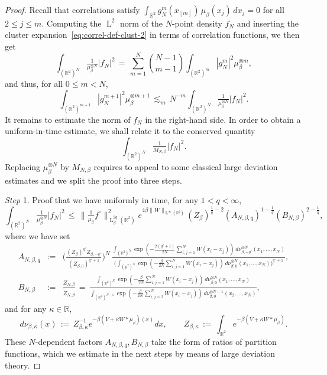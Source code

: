 \documentclass[a4paper,11pt,reqno,noindent]{amsart}
\theoremstyle{plain}
\numberwithin{equation}{section}
\newcommand{\R}{\mathbb R}
\newcommand{\3}{|\!|\!|}
\newcommand{\Ld}{\operatorname{L}}
\newcommand{\step}[1]{\noindent \textit{Step} #1.}
\begin{document}
\begin{proof}
Recall that correlations satisfy $\int_{\R^2}g_N^m(x_{[m]})\,\mu_\beta(x_j)\,dx_j=0$ for all \mbox{$2\le j\le m$.} Computing the $\Ld^2$ norm of the $N$-point density $f_N$ and inserting the cluster expansion~\eqref{eq:correl-def-clust-2} in terms of correlation functions, we then get
\[\int_{(\R^2)^N}\tfrac1{\mu_\beta^{\otimes N}}|f_N|^2\,=\,\sum_{m=1}^N\binom{N-1}{m-1}\int_{(\R^2)^{m}}|g_N^{m}|^2\mu_\beta^{\otimes m},\]
and thus, for all $0\le m<N$,
\begin{equation}\label{eq:apriori-sym-est}
\int_{(\R^2)^{m+1}}|g_N^{m+1}|^2\mu_\beta^{\otimes m+1}\,\lesssim_m\, N^{-m}\int_{(\R^2)^N}\tfrac1{\mu_\beta^{\otimes N}}|f_N|^2.
\end{equation}
It remains to estimate the norm of $f_N$ in the right-hand side. In order to obtain a uniform-in-time estimate, we shall relate it to the conserved quantity
\[\int_{(\R^2)^N}\tfrac1{M_{N,\beta}}|f_N|^2.\]
Replacing $\mu_\beta^{\otimes N}$ by $M_{N,\beta}$ requires to appeal to some classical large deviation estimates and we split the proof into three steps.

\medskip
\step1 Proof that we have uniformly in time, for any $1<q<\infty$,
\begin{equation}\label{eq:apriori-almost-conserv}
\int_{(\R^2)^N}\tfrac1{\mu_\beta^{\otimes N}}|f_N|^2\,\le\,\|\tfrac1{\mu_\beta}f^\circ\|_{\Ld^{2q}_\beta(\R^2)}^2e^{4\beta \|W\|_{\Ld^\infty(\R^2)}}(Z_\beta)^{\frac1q-2}(A_{N,\beta,q})^{1-\frac1{q}}(B_{N,\beta})^{2-\frac1q},
\end{equation}
where we have set
\begin{eqnarray*}
A_{N,\beta,q}&:=&\Big(\tfrac{(Z_\beta)^{q'}Z_{\beta,-q'}}{(Z_{\beta,0})^{q'+1}}\Big)^{N}\,\tfrac{\int_{(\R^2)^N}\exp(-\frac{\beta(q'+1)}{2N}\sum_{i,j=1}^NW(x_i-x_j))\,d\nu_{\beta,-q'}^{\otimes N}(x_1,\ldots,x_N)}{\big(\int_{(\R^2)^N}\exp(-\frac{\beta}{2N}\sum_{i,j=1}^NW(x_i-x_j))\,d\nu_{\beta,0}^{\otimes N}(x_1,\ldots,x_N)\big)^{q'+1}},\\
B_{N,\beta}&:=&\tfrac{Z_{N,\beta}}{\tilde Z_{N,\beta}}\,=\,\tfrac{\int_{(\R^2)^N}\exp(-\frac\beta{2N}\sum_{i,j=1}^NW(x_i-x_j))\,d\nu_{\beta,0}^{\otimes N}(x_1,\ldots,x_N)}{\int_{(\R^2)^{N-1}}\exp(-\frac\beta{2N}\sum_{i,j=2}^NW(x_i-x_j))\,d\nu_{\beta,0}^{\otimes N-1}(x_2,\ldots,x_N)},
\end{eqnarray*}
and for any $\kappa\in\R$,
\[d\nu_{\beta,\kappa}(x)\,:=\,Z_{\beta,\kappa}^{-1}e^{-\beta(V+\kappa W\ast\mu_\beta)(x)}dx,\qquad Z_{\beta,\kappa}\,:=\,\int_{\R^2}e^{-\beta(V+\kappa W\ast\mu_\beta)}.\]
These $N$-dependent factors $A_{N,\beta,q},B_{N,\beta}$ take the form of ratios of partition functions, which we  estimate in the next steps by means of large deviation theory.


\end{proof}
\end{document}
